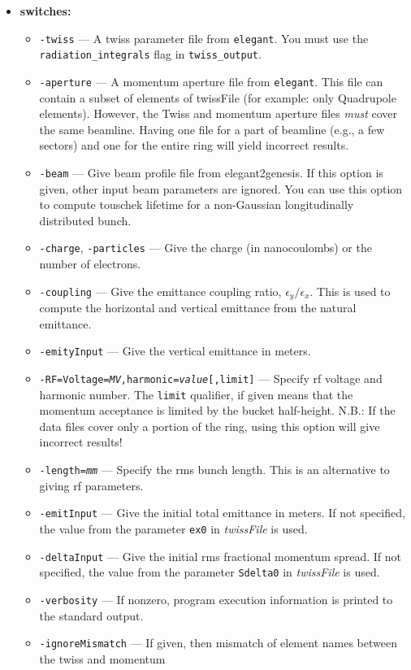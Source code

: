 \documentclass[11pt]{article}
\begin{document}
\begin{itemize}
\item {\bf switches:}
\begin{itemize}
\item {\tt -twiss} --- A twiss parameter file from {\tt elegant}. 
You must use the \verb|radiation_integrals| flag in \verb|twiss_output|.
\item {\tt -aperture} --- A momentum aperture file from {\tt elegant}.
This file can contain a subset of elements of twissFile (for example:
only Quadrupole elements).  However, the Twiss and momentum aperture
files {\em must} cover the same beamline. Having one file for a part
of beamline (e.g., a few sectors) and one for the entire ring will
yield incorrect results.
\item {\tt -beam} --- Give beam profile file from elegant2genesis. If
  this option is given, other input beam parameters are ignored. You
  can use this option to compute touschek lifetime for a non-Gaussian
  longitudinally distributed bunch.
\item {\tt -charge}, {\tt -particles} --- Give the charge (in nanocoulombs) or the
 number of electrons.
\item {\tt -coupling} --- Give the emittance coupling ratio, $\epsilon_y/\epsilon_x$.  This is
 used to compute the horizontal and vertical emittance from the natural emittance.
\item {\tt -emityInput} --- Give the vertical emittance in meters.
\item {\tt -RF=Voltage={\em MV},harmonic={\em value}[,limit]} --- Specify rf voltage and harmonic number.
 The {\tt limit} qualifier, if given means that the momentum acceptance is limited by the bucket
 half-height.
 N.B.: If the data files cover only a portion of the ring, using this option will give incorrect results!
\item {\tt -length={\em mm}} --- Specify the rms bunch length.  This is an alternative to giving rf parameters.
\item {\tt -emitInput} --- Give the initial total emittance in meters.  If not specified,
the value from the parameter \verb|ex0| in {\em twissFile} is used.
\item {\tt -deltaInput} --- Give the initial rms fractional momentum spread.  If not
specified, the value from the parameter \verb|Sdelta0| in {\em twissFile} is used.
\item {\tt -verbosity} --- If nonzero, program execution information is printed to the standard output.
\item {\tt -ignoreMismatch} --- If given, then mismatch of element names between the twiss and momentum

\end{itemize}
\end{itemize}
\end{document}
